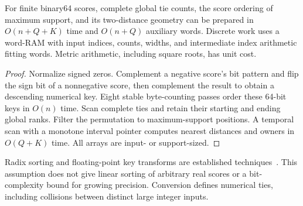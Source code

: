 \begin{proposition}
\label{prop:radix}
For finite binary64 scores, complete global tie counts, the score ordering
of maximum support, and its two-distance geometry can be prepared in
$O(n+Q+K)$ time and $O(n+Q)$ auxiliary words. Discrete work uses a word-RAM
with input indices, counts, widths, and intermediate index arithmetic
fitting words. Metric arithmetic, including square roots, has unit cost.
\end{proposition}
\begin{proof}
Normalize signed zeros. Complement a negative score's bit pattern and flip
the sign bit of a nonnegative score, then complement the result to obtain a
descending numerical key. Eight stable byte-counting passes order these
64-bit keys in $O(n)$ time. Scan complete ties and retain their starting and
ending global ranks. Filter the permutation to maximum-support positions.
A temporal scan with a monotone interval pointer computes nearest distances
and owners in $O(Q+K)$ time. All arrays are input- or support-sized.
\end{proof}
Radix sorting and floating-point key transforms are established
techniques~\cite{demaine2011radix,herf2001radix}. This assumption does not give
linear sorting of arbitrary real scores or a bit-complexity bound for growing
precision. Conversion defines numerical ties, including collisions between
distinct large integer inputs.

